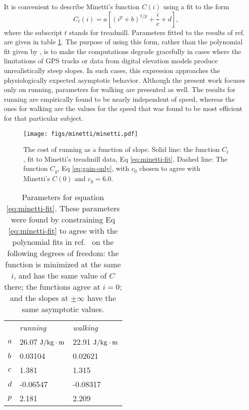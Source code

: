\documentclass[10pt,letterpaper]{article}
\begin{document}
It is convenient to describe Minetti's function $C(i)$ using a fit to the form
\begin{equation}\label{eq:minetti-fit}
  C_t(i) = a\left[(i^p+b)^{1/p}+\frac{i}{c}+d\right],
\end{equation}
where the subscript $t$ stands for treadmill.
Parameters fitted to the results of ref.~\cite{minetti} are given in table \ref{table:minetti-params}.
The purpose of using this form, rather than the polynomial fit given by \cite{minetti}, is
to make the computations degrade gracefully in cases where the limitations of GPS tracks or data from digital elevation models
produce unrealistically steep slopes. In such cases, this expression approaches the physiologically
expected asymptotic behavior. Although the present work focuses only on running, parameters for walking
are presented as well. The results for running are empirically found to be nearly independent of speed,
whereas the ones for walking are the values for the speed that was found to be most efficient for that
particular subject.

\begin{figure}[h]
\texttt{[image: figs/minetti/minetti.pdf]}
\centering
\caption{The cost of running as a function of slope. Solid line: the function $C_t$, fit to Minetti's treadmill data, Eq \ref{eq:minetti-fit}. Dashed line:
The function $C_g$, Eq \ref{eq:gain-only}, with $c_0$ chosen to agree with Minetti's $C(0)$ and $c_g=6.0$.}
\label{fig:minetti}
\end{figure}

\begin{table}[h]
\caption{Parameters for equation \eqref{eq:minetti-fit}. These parameters were found by constraining
Eq \ref{eq:minetti-fit} to agree with the polynomial fits in ref.~\cite{minetti} on the following
degrees of freedom: the function is minimized at the same $i$, and has the same value of $C$ there;
the functions agree at $i=0$; and the slopes at $\pm\infty$ have the same asymptotic values.}
\begin{tabular}{lll}
   & \emph{running} & \emph{walking} \\
$a$  & 26.07 $\textup{J}/\textup{kg}\cdot\textup{m}$ & 22.91 $\textup{J}/\textup{kg}\cdot\textup{m}$ \\
$b$  & 0.03104 & 0.02621 \\
$c$ & 1.381 & 1.315 \\
$d$ & -0.06547 & -0.08317 \\
$p$ & 2.181 & 2.209
\end{tabular}
\label{table:minetti-params}
\end{table}
\end{document}
